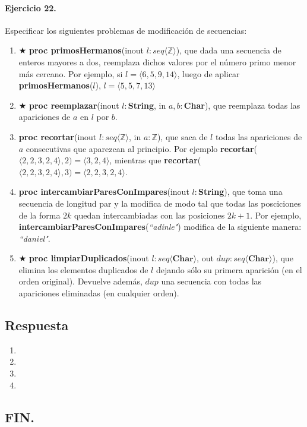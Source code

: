\documentclass[a4paper]{article}
\begin{document}
\paragraph*{Ejercicio 22.} Especificar los siguientes problemas de modificación de secuencias:
	\begin{enumerate}[label=\alph*)]
		\item $\bigstar$ \textbf{proc primosHermanos}(inout $l:seq\langle \mathbb{Z}\rangle$), que dada una secuencia de enteros mayores a dos, reemplaza dichos valores por el número primo menor más cercano. Por ejemplo, si $l=\langle 6,5,9,14 \rangle$, luego de aplicar \textbf{primosHermanos}($l$), $l=\langle 5,5,7,13 \rangle$
		\item $\bigstar$ \textbf{proc reemplazar}(inout $l:$\textbf{String}, in $a,b:$\textbf{Char}), que reemplaza todas las apariciones de $a$ en $l$ por $b$.
		\item \textbf{proc recortar}(inout $l:seq\langle \mathbb{Z}\rangle$, in $a:\mathbb{Z}$), que saca de $l$ todas las apariciones de $a$ consecutivas que aparezcan al principio. Por ejemplo \textbf{recortar}($\langle 2,2,3,2,4\rangle ,2)=\langle 3,2,4\rangle$, mientras que \textbf{recortar}($\langle 2,2,3,2,4\rangle ,3)=\langle 2,2,3,2,4\rangle$.
		\item \textbf{proc intercambiarParesConImpares}(inout $l:$\textbf{String}), que toma una secuencia de longitud par y la modifica de modo tal que todas las posciciones de la forma $2k$ quedan intercambiadas con las posiciones $2k+1$. Por ejemplo, \textbf{intercambiarParesConImpares}(\textit{``adinle"}) modifica de la siguiente manera: \textit{``daniel"}.
		\item $\bigstar$ \textbf{proc limpiarDuplicados}(inout $l: seq\langle \mathbb{\textbf{Char}}\rangle$, out $dup:seq\langle \mathbb{\textbf{Char}}\rangle$), que elimina los elementos duplicados de $l$ dejando sólo su primera aparición (en el orden original). Devuelve además, $dup$ una secuencia con todas las apariciones eliminadas (en cualquier orden).
	\end{enumerate}
\subsection*{Respuesta}
	\begin{enumerate}[label=\alph*)]
		\item
		\item
		\item
		\item
	\end{enumerate}

\begin{center}
\section*{FIN.}
\end{center}
\end{document}
